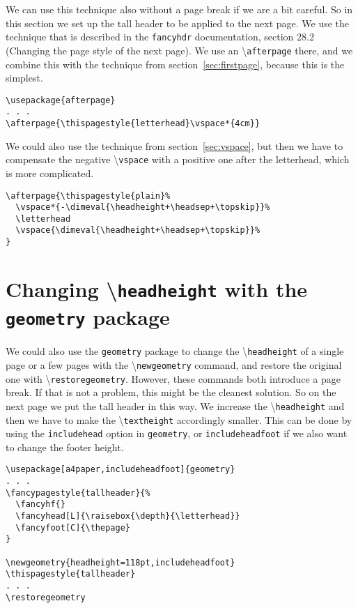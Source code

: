 \documentclass[twoside]{article}
\newcommand\letterhead{%
  \fancycenter{\texttt{[image: example-image-a]}}
              {}
              {\fancyhdrbox[t]{COMPANY NAME\\Street Address\\City}}%
}
\newcommand\cs[1]{\textbackslash\texttt{#1}}
\begin{document}
\noindent
\begin{boxedminipage}{\textwidth}
We can use this technique also without a page break if we are a bit careful. So in this section we set up the tall header to be applied to the next page. We use the technique that is described in the \texttt{fancyhdr} documentation, section 28.2 (Changing the page style of the next page). We use an \cs{afterpage} there, and we combine this with the technique from section~\ref{sec:firstpage}, because this is the simplest.
\begin{verbatim}
\usepackage{afterpage}
. . .
\afterpage{\thispagestyle{letterhead}\vspace*{4cm}}
\end{verbatim}
 We could also use the technique from section~\ref{sec:vspace}, but then we have to compensate the negative \cs{vspace} with a positive one after the letterhead, which is more complicated.
\begin{verbatim}
\afterpage{\thispagestyle{plain}%
  \vspace*{-\dimeval{\headheight+\headsep+\topskip}}%
  \letterhead
  \vspace{\dimeval{\headheight+\headsep+\topskip}}%
}
\end{verbatim}
\end{boxedminipage}
\medskip

\lipsum

\section{Changing \cs{headheight} with the \texttt{geometry} package}
\label{sec:geomheadheight}

\noindent
\begin{boxedminipage}{\textwidth}
We could also use the \texttt{geometry} package to change the \cs{headheight} of a single page or a few pages with the \cs{newgeometry} command, and restore the original one with \cs{restoregeometry}.
However, these commands both introduce a page break. If that is not a problem, this might be the cleanest solution. So on the next page we put the tall header in this way. We increase the  \cs{headheight} and then we have to make the \cs{textheight} accordingly smaller. This can be done by using the \texttt{includehead} option in \texttt{geometry}, or \texttt{includeheadfoot} if we also want to change the footer height.

\begin{verbatim}
\usepackage[a4paper,includeheadfoot]{geometry}
. . .
\fancypagestyle{tallheader}{%
  \fancyhf{}
  \fancyhead[L]{\raisebox{\depth}{\letterhead}}
  \fancyfoot[C]{\thepage}
}

\newgeometry{headheight=118pt,includeheadfoot}
\thispagestyle{tallheader}
. . .
\restoregeometry
\end{verbatim}
\end{boxedminipage}
\end{document}
